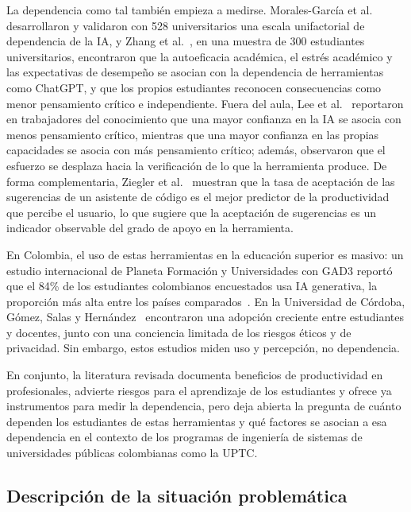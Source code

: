\documentclass[12pt,letterpaper]{article}
\numberwithin{table}{section}
\numberwithin{figure}{section}
\begin{document}
La dependencia como tal también empieza a medirse. Morales-García et al.~\cite{moralesgarcia2024development} desarrollaron y validaron con 528 universitarios una escala unifactorial de dependencia de la IA, y Zhang et al.~\cite{zhang2024dependency}, en una muestra de 300 estudiantes universitarios, encontraron que la autoeficacia académica, el estrés académico y las expectativas de desempeño se asocian con la dependencia de herramientas como ChatGPT, y que los propios estudiantes reconocen consecuencias como menor pensamiento crítico e independiente. Fuera del aula, Lee et al.~\cite{lee2025impact} reportaron en trabajadores del conocimiento que una mayor confianza en la IA se asocia con menos pensamiento crítico, mientras que una mayor confianza en las propias capacidades se asocia con más pensamiento crítico; además, observaron que el esfuerzo se desplaza hacia la verificación de lo que la herramienta produce. De forma complementaria, Ziegler et al.~\cite{ziegler2024measuring} muestran que la tasa de aceptación de las sugerencias de un asistente de código es el mejor predictor de la productividad que percibe el usuario, lo que sugiere que la aceptación de sugerencias es un indicador observable del grado de apoyo en la herramienta.

En Colombia, el uso de estas herramientas en la educación superior es masivo: un estudio internacional de Planeta Formación y Universidades con GAD3 reportó que el 84\% de los estudiantes colombianos encuestados usa IA generativa, la proporción más alta entre los países comparados~\cite{planeta2024inteligencia}. En la Universidad de Córdoba, Gómez, Salas y Hernández~\cite{gomez2025estudio} encontraron una adopción creciente entre estudiantes y docentes, junto con una conciencia limitada de los riesgos éticos y de privacidad. Sin embargo, estos estudios miden uso y percepción, no dependencia.

En conjunto, la literatura revisada documenta beneficios de productividad en profesionales, advierte riesgos para el aprendizaje de los estudiantes y ofrece ya instrumentos para medir la dependencia, pero deja abierta la pregunta de cuánto dependen los estudiantes de estas herramientas y qué factores se asocian a esa dependencia en el contexto de los programas de ingeniería de sistemas de universidades públicas colombianas como la UPTC.

\subsection{Descripción de la situación problemática}
\end{document}

